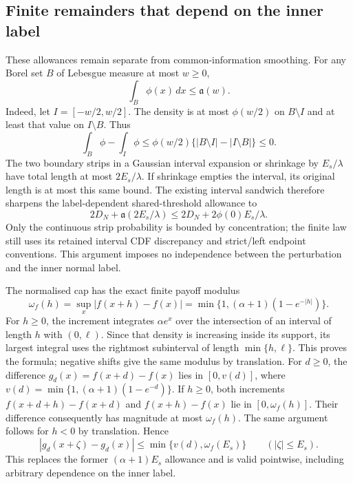 \documentclass[11pt]{article}
\begin{document}
\subsection{Finite remainders that depend on the inner label}

These allowances remain separate from common-information smoothing.
For any Borel set $B$ of Lebesgue measure at most $w\geq0$,
\begin{equation}
 \int_B\phi(x)\,dx\leq \mathfrak a(w).
 \label{eq:sharp-normal-set-concentration}
\end{equation}
Indeed, let $I=[-w/2,w/2]$. The density is at most $\phi(w/2)$ on
$B\setminus I$ and at least that value on $I\setminus B$. Thus
\begin{equation}
 \int_B\phi-\int_I\phi
 \leq\phi(w/2)\{|B\setminus I|-|I\setminus B|\}\leq0.
 \label{eq:sharp-normal-set-proof}
\end{equation}
The two boundary strips in a Gaussian interval expansion or shrinkage
by $E_s/\lambda$ have total length at most $2E_s/\lambda$.
If shrinkage empties the interval, its original length is at most this
same bound. The existing interval sandwich therefore sharpens the
label-dependent shared-threshold allowance to
\begin{equation}
 2D_N+\mathfrak a(2E_s/\lambda)
       \leq2D_N+2\phi(0)E_s/\lambda.
 \label{eq:sharp-threshold-inner-remainder}
\end{equation}
Only the continuous strip probability is bounded by concentration;
the finite law still uses its retained interval CDF discrepancy and
strict/left endpoint conventions. This argument imposes no independence
between the perturbation and the inner normal label.

The normalised cap has the exact finite payoff modulus
\begin{equation}
 \omega_f(h)=\sup_x|f(x+h)-f(x)|
       =\min\{1,(\alpha+1)(1-e^{-|h|})\}.
 \label{eq:sharp-cap-payoff-modulus}
\end{equation}
For $h\geq0$, the increment integrates $\alpha e^x$ over the intersection
of an interval of length $h$ with $(0,\ell)$. Since that density is
increasing inside its support, its largest integral uses the rightmost
subinterval of length $\min\{h,\ell\}$. This proves the formula;
negative shifts give the same modulus by translation. For $d\geq0$,
the difference $g_d(x)=f(x+d)-f(x)$ lies in $[0,v(d)]$, where
$v(d)=\min\{1,(\alpha+1)(1-e^{-d})\}$. If $h\geq0$, both increments
$f(x+d+h)-f(x+d)$ and $f(x+h)-f(x)$ lie in $[0,\omega_f(h)]$.
Their difference consequently has magnitude at most $\omega_f(h)$.
The same argument follows for $h<0$ by translation. Hence
\begin{equation}
 |g_d(x+\zeta)-g_d(x)|
 \leq\min\{v(d),\omega_f(E_s)\}\qquad(|\zeta|\leq E_s).
 \label{eq:sharp-raw-inner-remainder}
\end{equation}
This replaces the former $(\alpha+1)E_s$ allowance and is valid
pointwise, including arbitrary dependence on the inner label.
\end{document}
